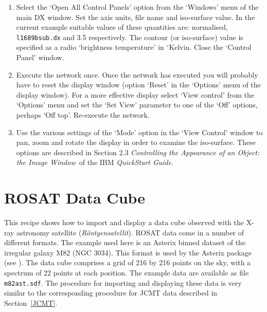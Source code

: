 \begin{enumerate}
  \begin{enumerate}

    \item Select the `Open All Control Panels' option from the `Windows'
     menu of the main DX window.  Set the axis units, file name
     and iso-surface value.  In the current example suitable
     values of these quantities are: normalised, {\tt l1689bsub.dx} and
     3.5 respectively.
     The contour (or iso-surface) value is specified as a radio
     `brightness temperature' in $^{\circ}$Kelvin.  Close the `Control
     Panel' window.

    \item Execute the network once.  Once the network has executed you
     will probably have to reset the display window (option `Reset' in
     the `Options' menu of the display window).  For a more effective
     display select `View control' from the `Options' menu and set the
     `Set View' parameter to one of the `Off' options, perhaps `Off top'.
     Re-execute the network.

    \item Use the various settings of the `Mode' option in the `View
     Control' window to pan, zoom and rotate the display in order to
     examine the iso-surface.  These options are described in Section
     2.3 {\it Controlling the Appearance of an Object: the Image
     Window}\, of the IBM {\it QuickStart Guide}\cite{QUICKS}.

  \end{enumerate}

\end{enumerate}


\newpage
\section{\label{ROSAT}ROSAT Data Cube}

This recipe shows how to import and display a data cube observed with the 
X-ray astronomy satellite ({\it R\"{o}ntgensatellit}).  ROSAT data come
in a number of different formats.  The example used here is an Asterix
binned dataset of the irregular galaxy M82 (NGC 3034).  This format is
used by the Asterix package (see \cite{SUN98}).
The data cube comprises a grid of 216 by 216 points on the sky, with a
spectrum of 22 points at each position.  The example data are available
as file {\tt m82ast.sdf}.  The procedure for importing and displaying these
data is very similar to the corresponding procedure for JCMT data
described in Section~\ref{JCMT}.

